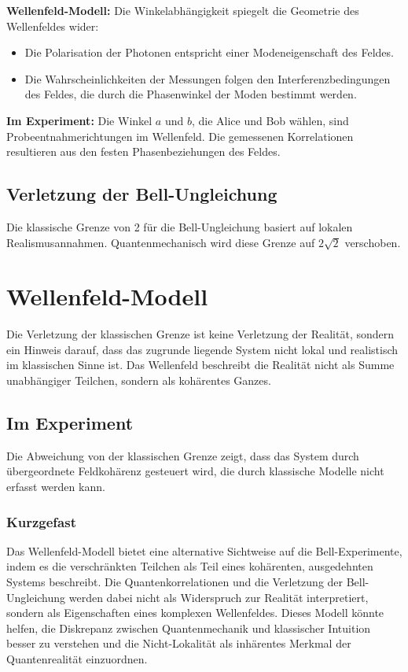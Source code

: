 \documentclass[12pt,a4paper]{article}
\begin{document}
	\textbf{Wellenfeld-Modell:}
	Die Winkelabhängigkeit spiegelt die Geometrie des Wellenfeldes wider:
	\begin{itemize}
		\item Die Polarisation der Photonen entspricht einer Modeneigenschaft des Feldes.
		\item Die Wahrscheinlichkeiten der Messungen folgen den Interferenzbedingungen des Feldes, die durch die Phasenwinkel der Moden bestimmt werden.
	\end{itemize}
	
	\textbf{Im Experiment:}
	Die Winkel $a$ und $b$, die Alice und Bob wählen, sind Probeentnahmerichtungen im Wellenfeld. Die gemessenen Korrelationen resultieren aus den festen Phasenbeziehungen des Feldes.
	
	
	\subsection{Verletzung der Bell-Ungleichung}
	
	Die klassische Grenze von 2 für die Bell-Ungleichung basiert auf lokalen Realismusannahmen. Quantenmechanisch wird diese Grenze auf $2\sqrt{2}$ verschoben.
	
	\section{Wellenfeld-Modell}
	
	Die Verletzung der klassischen Grenze ist keine Verletzung der Realität, sondern ein Hinweis darauf, dass das zugrunde liegende System nicht lokal und realistisch im klassischen Sinne ist. Das Wellenfeld beschreibt die Realität nicht als Summe unabhängiger Teilchen, sondern als kohärentes Ganzes.
	
	\subsection{Im Experiment}
	
	Die Abweichung von der klassischen Grenze zeigt, dass das System durch übergeordnete Feldkohärenz gesteuert wird, die durch klassische Modelle nicht erfasst werden kann.
	
	\subsubsection{Kurzgefast}
	
	Das Wellenfeld-Modell bietet eine alternative Sichtweise auf die Bell-Experimente, indem es die verschränkten Teilchen als Teil eines kohärenten, ausgedehnten Systems beschreibt. Die Quantenkorrelationen und die Verletzung der Bell-Ungleichung werden dabei nicht als Widerspruch zur Realität interpretiert, sondern als Eigenschaften eines komplexen Wellenfeldes. Dieses Modell könnte helfen, die Diskrepanz zwischen Quantenmechanik und klassischer Intuition besser zu verstehen und die Nicht-Lokalität als inhärentes Merkmal der Quantenrealität einzuordnen.
	
\end{document}
